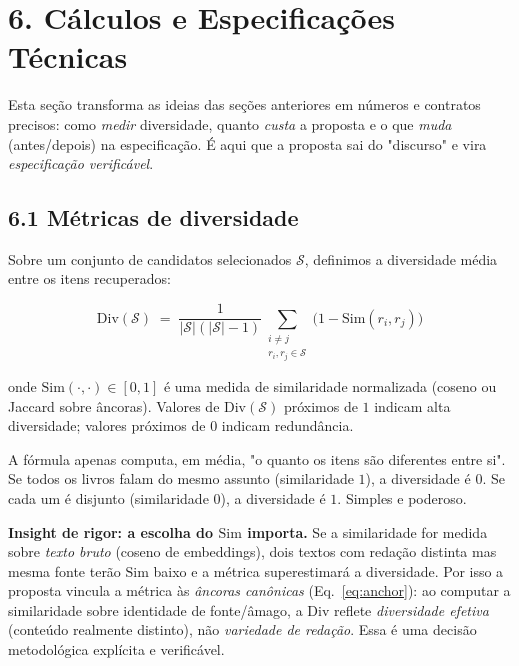 
\section*{6. Cálculos e Especificações Técnicas}

 Esta seção transforma as ideias das seções anteriores em números e
contratos precisos: como \emph{medir} diversidade, quanto \emph{custa} a proposta
e o que \emph{muda} (antes/depois) na especificação. É aqui que a proposta sai do
"discurso" e vira \emph{especificação verificável}.

\subsection*{6.1 Métricas de diversidade}

 Sobre um conjunto de candidatos selecionados $\mathcal{S}$, definimos a
diversidade média entre os itens recuperados:

\begin{equation}
\label{eq:diversity}
\text{Div}(\mathcal{S})\;=\;\frac{1}{|\mathcal{S}|(|\mathcal{S}|-1)}
\sum_{\substack{i \neq j \\ r_i, r_j \in \mathcal{S}}}
\bigl(1 - \text{Sim}(r_i, r_j)\bigr)
\end{equation}

\noindent onde $\text{Sim}(\cdot,\cdot) \in [0,1]$ é uma medida de similaridade
normalizada (coseno ou Jaccard sobre âncoras). Valores de $\text{Div}(\mathcal{S})$
próximos de $1$ indicam alta diversidade; valores próximos de $0$ indicam
redundância.

\begin{intuicao}
A fórmula apenas computa, em média, "o quanto os itens são diferentes entre si".
Se todos os livros falam do mesmo assunto (similaridade $1$), a diversidade é $0$.
Se cada um é disjunto (similaridade $0$), a diversidade é $1$. Simples e poderoso.
\end{intuicao}

 \textbf{Insight de rigor: a escolha do $\text{Sim}$ importa.} Se a
similaridade for medida sobre \emph{texto bruto} (coseno de embeddings), dois
textos com redação distinta mas mesma fonte terão $\text{Sim}$ baixo e a métrica
superestimará a diversidade. Por isso a proposta vincula a métrica às
\emph{âncoras canônicas} (Eq.~\ref{eq:anchor}): ao computar a similaridade sobre
identidade de fonte/âmago, a $\text{Div}$ reflete \emph{diversidade efetiva}
(conteúdo realmente distinto), não \emph{variedade de redação}. Essa é uma decisão
metodológica explícita e verificável.

